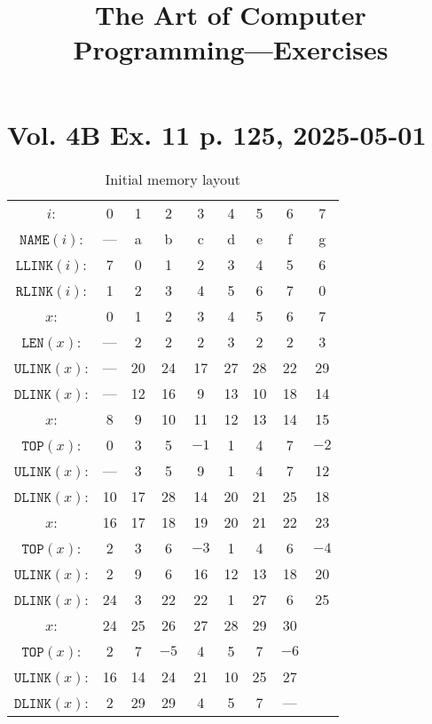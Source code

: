 \documentclass[a4paper,landscape,11pt]{article}
\title{The Art of Computer Programming---Exercises}
\date{}
\begin{document}
\maketitle

\section*{Vol. 4B Ex. 11 p. 125, 2025-05-01}

\begin{table}
	\begin{center}
		\caption{Initial memory layout}
		\begin{tabular}{c c c c c c c c c }
			\hline
			$i$:                 & 0   & 1  & 2    & 3    & 4  & 5  & 6    & 7    \\
			$\texttt{NAME}(i)$:  & --- & a  & b    & c    & d  & e  & f    & g    \\
			$\texttt{LLINK}(i)$: & 7   & 0  & 1    & 2    & 3  & 4  & 5    & 6    \\
			$\texttt{RLINK}(i)$: & 1   & 2  & 3    & 4    & 5  & 6  & 7    & 0    \\
			\hline
			$x$:                 & 0   & 1  & 2    & 3    & 4  & 5  & 6    & 7    \\
			$\texttt{LEN}(x)$:   & --- & 2  & 2    & 2    & 3  & 2  & 2    & 3    \\
			$\texttt{ULINK}(x)$: & --- & 20 & 24   & 17   & 27 & 28 & 22   & 29   \\
			$\texttt{DLINK}(x)$: & --- & 12 & 16   & 9    & 13 & 10 & 18   & 14   \\
			\hline
			$x$:                 & 8   & 9  & 10   & 11   & 12 & 13 & 14   & 15   \\
			$\texttt{TOP}(x)$:   & 0   & 3  & 5    & $-1$ & 1  & 4  & 7    & $-2$ \\
			$\texttt{ULINK}(x)$: & --- & 3  & 5    & 9    & 1  & 4  & 7    & 12   \\
			$\texttt{DLINK}(x)$: & 10  & 17 & 28   & 14   & 20 & 21 & 25   & 18   \\
			\hline
			$x$:                 & 16  & 17 & 18   & 19   & 20 & 21 & 22   & 23   \\
			$\texttt{TOP}(x)$:   & 2   & 3  & 6    & $-3$ & 1  & 4  & 6    & $-4$ \\
			$\texttt{ULINK}(x)$: & 2   & 9  & 6    & 16   & 12 & 13 & 18   & 20   \\
			$\texttt{DLINK}(x)$: & 24  & 3  & 22   & 22   & 1  & 27 & 6    & 25   \\
			\hline
			$x$:                 & 24  & 25 & 26   & 27   & 28 & 29 & 30   &      \\
			$\texttt{TOP}(x)$:   & 2   & 7  & $-5$ & 4    & 5  & 7  & $-6$ &      \\
			$\texttt{ULINK}(x)$: & 16  & 14 & 24   & 21   & 10 & 25 & 27   &      \\
			$\texttt{DLINK}(x)$: & 2   & 29 & 29   & 4    & 5  & 7  & ---  &      \\
		\end{tabular}
	\end{center}
\end{table}
\end{document}
